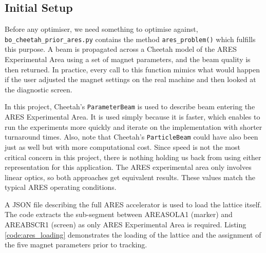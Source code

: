 \subsection{Initial Setup}
Before any optimiser, we need something to optimise against, \texttt{bo\_cheetah\_prior\_ares.py} contains
the method \texttt{ares\_problem()} which fulfills this purpose. A beam is propagated across a Cheetah model of the ARES Experimental 
Area using a set of magnet parameters, and the beam quality is then returned. In practice, every call to this function 
mimics what would happen if the user adjusted the magnet settings on the real machine and then looked at the diagnostic screen. \

In this project, Cheetah's \texttt{ParameterBeam} is used to describe beam entering the ARES Experimental Area. It is used 
simply because it is faster, which enables to run the experiments more quickly and iterate on the implementation with shorter turnaround times.
 Also, note that Cheetah's \texttt{ParticleBeam} could have also been just as well but with more computational cost. Since speed is not the most critical 
 concern in this project, there is nothing holding us back from using either representation for this application. The ARES experimental area only 
 involves linear optics, so both approaches get equivalent results. These values match the typical ARES operating conditions.

A JSON file describing the full ARES accelerator is used to load the lattice itself. The code extracts the sub-segment between AREASOLA1 (marker) and AREABSCR1 (screen) 
as only ARES Experimental Area is required. Listing \ref{code:ares_loading} demonstrates the loading of the lattice and the assignment of the five magnet parameters prior to tracking.



